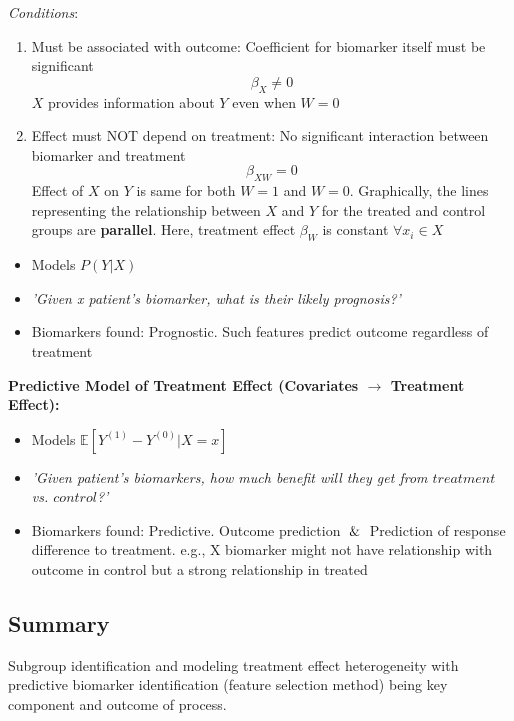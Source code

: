 \documentclass[../main.tex]{subfiles}
\begin{document}
\textit{Conditions}:

\begin{enumerate}
    \item Must be associated with outcome: Coefficient for biomarker itself must be significant
    \[
    \beta_X \neq 0
    \]
    $X$ provides information about $Y$ even when $W=0$
    \item Effect must NOT depend on treatment: No significant interaction between biomarker and treatment
    \[
    \beta_{XW} = 0
    \]
    Effect of $X$ on $Y$ is same for both $W=1$ and $W=0$. Graphically, the lines representing the relationship between $X$ and $Y$ for the treated and control groups are \textbf{parallel}. Here, treatment effect $\beta_W$ is constant $\forall x_i \in X$
\end{enumerate}

 \begin{itemize}
     \item Models $P(Y|X)$
     \item \textit{'Given x patient's biomarker, what is their likely prognosis?'}
     \item Biomarkers found: Prognostic. Such features predict outcome regardless of treatment
 \end{itemize}

 \textbf{Predictive Model of Treatment Effect (Covariates $\rightarrow$ Treatment Effect):} 
 \begin{itemize}
     \item Models $\mathbb{E}[Y^{(1)}-Y^{(0)}|X=x]$
     \item \textit{'Given patient's biomarkers, how much benefit will they get from $treatment$ vs. $control$?'}
     \item Biomarkers found: Predictive. Outcome prediction $\And$ Prediction of response difference to treatment. e.g., X biomarker might not have relationship with  outcome in control but a strong relationship in treated
 \end{itemize}
\subsection*{Summary} Subgroup identification and modeling treatment effect heterogeneity with predictive biomarker identification (feature selection method) being key component and outcome of process. 
 
\end{document}
